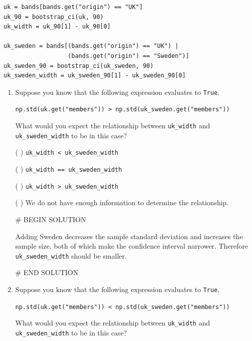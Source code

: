 \documentclass[twoside,12pt]{article}
\begin{document}
{\bigskip

\begin{verbatim}
uk = bands[bands.get("origin") == "UK"]
uk_90 = bootstrap_ci(uk, 90)
uk_width = uk_90[1] - uk_90[0]

uk_sweden = bands[(bands.get("origin") == "UK") |
                  (bands.get("origin") == "Sweden")]
uk_sweden_90 = bootstrap_ci(uk_sweden, 90)
uk_sweden_width = uk_sweden_90[1] - uk_sweden_90[0]
\end{verbatim}

\newpage

\begin{enumerate}

    \item [(i)] Suppose you know that the following expression evaluates to \texttt{True}.

    \medskip
    
    \verb|np.std(uk.get("members")) > np.std(uk_sweden.get("members"))|

    \medskip
    
    What would you expect the relationship between \texttt{uk\_width} and \texttt{uk\_sweden\_width} to be in this case?

\medskip

( ) \texttt{uk\_width < uk\_sweden\_width}

\smallskip
( ) \texttt{uk\_width == uk\_sweden\_width}

\smallskip
( ) \texttt{uk\_width > uk\_sweden\_width}

\smallskip
( ) We do not have enough information to determine the relationship.

# BEGIN SOLUTION


Adding Sweden decreases the sample standard deviation and increases the sample size, both of which make the confidence interval narrower. Therefore \texttt{uk\_sweden\_width} should be smaller.


# END SOLUTION

\medskip


    \item [(ii)]  Suppose you know that the following expression evaluates to \texttt{True}.

    \medskip
    
    \verb|np.std(uk.get("members")) < np.std(uk_sweden.get("members"))|

    \medskip
    
    What would you expect the relationship between \texttt{uk\_width} and \texttt{uk\_sweden\_width} to be in this case?


\end{enumerate}}
\end{document}

